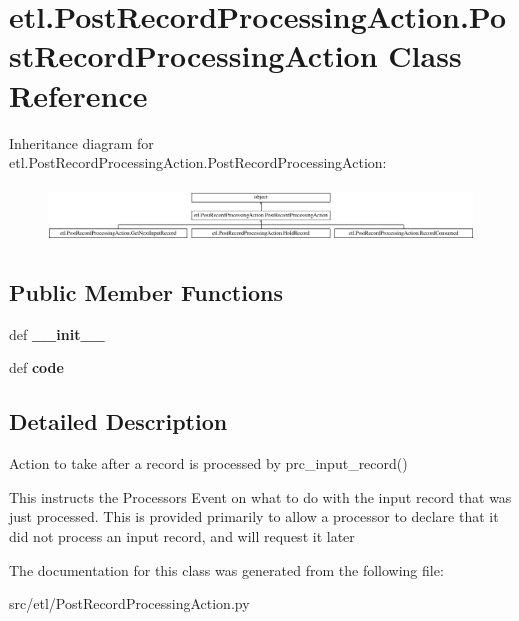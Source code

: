 \hypertarget{classetl_1_1PostRecordProcessingAction_1_1PostRecordProcessingAction}{\section{etl.\-Post\-Record\-Processing\-Action.\-Post\-Record\-Processing\-Action Class Reference}
\label{classetl_1_1PostRecordProcessingAction_1_1PostRecordProcessingAction}
}
Inheritance diagram for etl.\-Post\-Record\-Processing\-Action.\-Post\-Record\-Processing\-Action\-:\begin{figure}[H]
\begin{center}
\leavevmode
\includegraphics[height=1.517615cm]{classetl_1_1PostRecordProcessingAction_1_1PostRecordProcessingAction}
\end{center}
\end{figure}
\subsection*{Public Member Functions}
\begin{DoxyCompactItemize}
\item 
\hypertarget{classetl_1_1PostRecordProcessingAction_1_1PostRecordProcessingAction_a28bbda2ee13e5c1adb09a2af2cb0a401}{def {\bfseries \-\_\-\-\_\-init\-\_\-\-\_\-}}\label{classetl_1_1PostRecordProcessingAction_1_1PostRecordProcessingAction_a28bbda2ee13e5c1adb09a2af2cb0a401}

\item 
\hypertarget{classetl_1_1PostRecordProcessingAction_1_1PostRecordProcessingAction_a08cc167e5e4c084a80b2133542e0f66b}{def {\bfseries code}}\label{classetl_1_1PostRecordProcessingAction_1_1PostRecordProcessingAction_a08cc167e5e4c084a80b2133542e0f66b}

\end{DoxyCompactItemize}


\subsection{Detailed Description}
\begin{DoxyVerb}Action to take after a record is processed by prc_input_record()

This instructs the Processors Event on what to do with the input record
that was just processed.  This is provided primarily to allow a processor
to declare that it did not process an input record, and will request it
later
\end{DoxyVerb}
 

The documentation for this class was generated from the following file\-:\begin{DoxyCompactItemize}
\item 
src/etl/Post\-Record\-Processing\-Action.\-py\end{DoxyCompactItemize}
